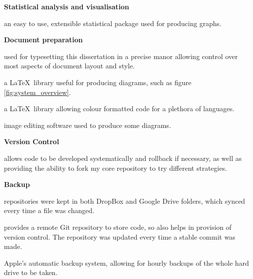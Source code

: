 \documentclass[12pt,twoside,notitlepage]{report}
\begin{document}
        \noindent\textbf{Statistical analysis and visualisation}
            \begin{description}[font=\normalfont\itshape, labelindent=10pt]
                \item[Matlab:] an easy to use, extensible statistical package used for producing graphs.
            \end{description}

        \noindent\textbf{Document preparation}
            \begin{description}[font=\normalfont\itshape, labelindent=10pt]
                \item[\LaTeX:] used for typesetting this dissertation in a precise manor allowing control over most 
                    aspects of document layout and style.
                \item[Tikz:] a \LaTeX\ library useful for producing diagrams, such as figure \ref{fig:system_overview}.
                \item[Listings:] a \LaTeX\ library allowing colour formatted code for a plethora of languages.
                \item[Adobe Photoshop:] image editing software used to produce some diagrams.
            \end{description}

        \noindent\textbf{Version Control}
            \begin{description}[font=\normalfont\itshape, labelindent=10pt]
                \item[Git:] allows code to be developed systematically and rollback if necessary, as well as providing  
                    the ability to fork my core repository to try different strategies.
            \end{description}

        \noindent\textbf{Backup}
            \begin{description}[font=\normalfont\itshape, labelindent=10pt]
                \item[DropBox and Google Drive:] repositories were kept in both DropBox and Google Drive folders, which 
                    synced every time a file was changed.
                \item[Github:] provides a remote Git repository to store code, so also helps in provision of version 
                    control. The repository was updated every time a stable commit was made.
                \item[Time machine:] Apple's automatic backup system, allowing for hourly backups of the whole hard drive 
                    to be taken.
            \end{description}
\end{document}
